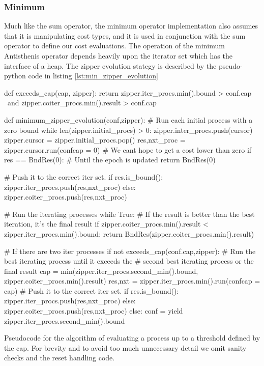 \subsubsection{Minimum}

Much like the sum operator, the minimum operator implementation also
assumes that it is manipulating cost types, and it is used in
conjunction with the sum operator to define our cost evaluations. The
operation of the minimum Antisthenis operator depends heavily upon the
iterator set which has the interface of a heap. The zipper evolution
stategy is described by the pseudo-python code in listing
\ref{lst:min_zipper_evolution}

\begin{code}
\begin{pycode}
def exceeds_cap(cap, zipper):
    return zipper.iter_procs.min().bound > conf.cap \
        and zipper.coiter_procs.min().result > conf.cap \


def minimum_zipper_evolution(conf,zipper):
    # Run each initial process with a zero bound
    while len(zipper.initial_procs) > 0:
        zipper.inter_procs.push(cursor)
        zipper.cursor = zipper.initial_procs.pop()
        res,nxt_proc = zipper.cursor.run(conf{cap = 0})
        # We cant hope to get a cost lower than zero
        if res == BndRes(0):
            # Until the epoch is updated
            return BndRes(0)

        # Push it to the correct iter set.
        if res.is_bound():
            zipper.iter_procs.push(res,nxt_proc)
        else:
            zipper.coiter_procs.push(res,nxt_proc)

    # Run the iterating processes
    while True:
        # If the result is better than the best iteration, it's the final result
        if zipper.coiter_procs.min().result < zipper.iter_procs.min().bound:
            return BndRes(zipper.coiter_procs.min().result)

        # If there are two iter processes
        if not exceeds_cap(conf.cap,zipper):
            # Run the best iterating process until it exceeds the
            # second best iterating process or the final result
            cap = min(zipper.iter_procs.second_min().bound,
                      zipper.coiter_procs.min().result)
            res,nxt =  zipper.iter_procs.min().run(conf{cap = cap})
            # Push it to the correct iter set.
            if res.is_bound():
                zipper.iter_procs.push(res,nxt_proc)
            else:
                zipper.coiter_procs.push(res,nxt_proc)
        else:
            conf = yield zipper.iter_procs.second_min().bound
\end{pycode}
  \caption{\label{lst:min_zipper_evolution}Pseudocode for the
    algorithm of evaluating a process up to a threshold defined by the
    cap. For brevity and to avoid too much unnecessary detail we omit
    sanity checks and the reset handling code.}
\end{code}

